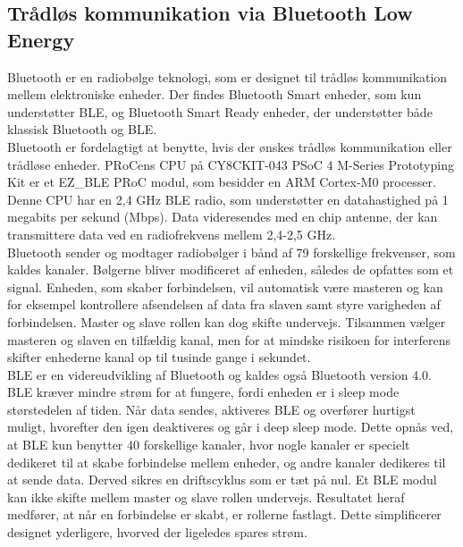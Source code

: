 \subsection{Trådløs kommunikation via Bluetooth Low Energy} 
Bluetooth er en radiobølge teknologi, som er designet til trådløs kommunikation mellem elektroniske enheder. Der findes Bluetooth Smart enheder, som kun understøtter BLE, og Bluetooth Smart Ready enheder, der understøtter både klassisk Bluetooth og BLE. \citep{Sauter2011,Gupta2013}\\
Bluetooth er fordelagtigt at benytte, hvis der ønskes trådløs kommunikation eller trådløse enheder. PRoCens CPU på CY8CKIT-043 PSoC 4 M-Series Prototyping Kit er et EZ\_BLE PRoC modul, som besidder en ARM Cortex-M0 processer. Denne CPU har en 2,4 GHz BLE radio, som understøtter en datahastighed på 1 megabits per sekund (Mbps). Data videresendes med en chip antenne, der kan transmittere data ved en radiofrekvens mellem 2,4-2,5 GHz.~\citep{Semiconductor2016PRoC,Semiconductor2016BLEdyb}\\
Bluetooth sender og modtager radiobølger i bånd af 79 forskellige frekvenser, som kaldes kanaler. Bølgerne bliver modificeret af enheden, således de opfattes som et signal. Enheden, som skaber forbindelsen, vil automatisk være masteren og kan for eksempel kontrollere afsendelsen af data fra slaven samt styre varigheden af forbindelsen. Master og slave rollen kan dog skifte undervejs. Tilsammen vælger masteren og slaven en tilfældig kanal, men for at mindske risikoen for interferens skifter enhederne kanal op til tusinde gange i sekundet.~\citep{CYPRESS2016workshopBLE,Sauter2011} \\
BLE er en videreudvikling af Bluetooth og kaldes også Bluetooth version 4.0. BLE kræver mindre strøm for at fungere, fordi enheden er i sleep mode størstedelen af tiden. Når data sendes, aktiveres BLE og overfører hurtigst muligt, hvorefter den igen deaktiveres og går i deep sleep mode. Dette opnås ved, at BLE kun benytter 40 forskellige kanaler, hvor nogle kanaler er specielt dedikeret til at skabe forbindelse mellem enheder, og andre kanaler dedikeres til at sende data. Derved sikres en driftscyklus som er tæt på nul. Et BLE modul kan ikke skifte mellem master og slave rollen undervejs. Resultatet heraf medfører, at når en forbindelse er skabt, er rollerne fastlagt. Dette simplificerer designet yderligere, hvorved der ligeledes spares strøm. \citep{Gupta2013}